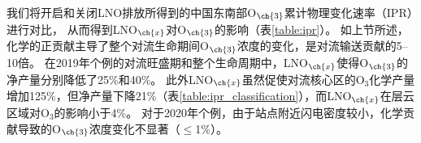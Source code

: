 我们将开启和关闭LNO排放所得到的中国东南部O$_{\ch{3}}$累计物理变化速率（IPR）进行对比，
从而得到LNO$_{\ch{x}}$对O$_{\ch{3}}$的影响（表\ref{table:ipr}）。
如上节所述，化学的正贡献主导了整个对流生命期间O$_{\ch{3}}$浓度的变化，是对流输送贡献的5--10倍。
在2019年个例的对流旺盛期和整个生命周期中，LNO$_{\ch{x}}$使得O$_{\ch{3}}$的净产量分别降低了25\%和40\%。
此外LNO$_{\ch{x}}$虽然促使对流核心区的O$_3$化学产量增加125\%，但净产量下降21\%（表\ref{table:ipr_classification}），而LNO$_{\ch{x}}$在层云区域对O$_3$的影响小于4\%。
对于2020年个例，由于站点附近闪电密度较小，化学贡献导致的O$_{\ch{3}}$浓度变化不显著（$\leq$1\%）。



